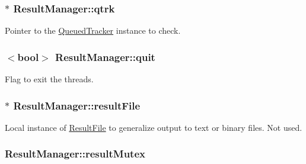 \subsubsection[{\texorpdfstring{qtrk}{qtrk}}]{$\ast$ Result\+Manager\+::qtrk\hspace{0.3cm}{\ttfamily [protected]}}\hypertarget{class_result_manager_a782d776e818e9be737c418d2151402ed}{}\label{class_result_manager_a782d776e818e9be737c418d2151402ed}


Pointer to the \hyperlink{class_queued_tracker}{Queued\+Tracker} instance to check. 

\subsubsection[{\texorpdfstring{quit}{quit}}]{$<$bool$>$ Result\+Manager\+::quit\hspace{0.3cm}{\ttfamily [protected]}}\hypertarget{class_result_manager_a2e8af4e9f24aff29025adb24032d788e}{}\label{class_result_manager_a2e8af4e9f24aff29025adb24032d788e}


Flag to exit the threads. 

\subsubsection[{\texorpdfstring{result\+File}{resultFile}}]{$\ast$ Result\+Manager\+::result\+File\hspace{0.3cm}{\ttfamily [protected]}}\hypertarget{class_result_manager_a886e75626ba90bb4aff4dcf661733b30}{}\label{class_result_manager_a886e75626ba90bb4aff4dcf661733b30}


Local instance of \hyperlink{class_result_file}{Result\+File} to generalize output to text or binary files. Not used. 

\subsubsection[{\texorpdfstring{result\+Mutex}{resultMutex}}]{ Result\+Manager\+::result\+Mutex\hspace{0.3cm}{\ttfamily [protected]}}\hypertarget{class_result_manager_a736af7b3783f456fb05aa011bafc5bde}{}\label{class_result_manager_a736af7b3783f456fb05aa011bafc5bde}


